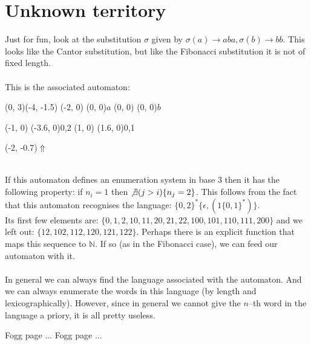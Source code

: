 \documentclass{article}
\begin{document}
\section*{Unknown territory}
Just for fun, look at the substitution $\sigma$ given by 
$\sigma(a) \rightarrow aba, \sigma(b) \rightarrow bb$. This looks like the 
Cantor substitution, but like the Fibonacci substitution it is not of fixed 
length.\\
\\
This is the associated automaton:\\
\begin{graph}(0, 3)(-4, -1.5)
  (-2, 0) (0, 0){$a$}
  (0, 0)  (0, 0){$b$}

  (-1, 0) \freetext(-3.6, 0){0,2}
   
  (1, 0) \freetext(1.6, 0){0,1}

  \freetext(-2, -0.7){$\Uparrow$}
\end{graph}\\
If this automaton defines an enumeration system in base 3 then it has the 
following property: if $n_i = 1$ then $\not\exists (j > i) \{ n_j = 2\}$. This 
follows from the fact that this automaton recognises the language:
$\{0, 2\}^* \{\epsilon, (1\{0, 1\}^*)\}$.\\
Its first few elements are:
$\{0, 1, 2, 10, 11, 20, 21, 22, 100, 101, 110, 111, 200\}$ and we left out:
$\{12, 102, 112, 120, 121, 122\}$. Perhaps there is an explicit function that
maps this sequence to $\mathbb{N}$. If so (as in the Fibonacci case), we can
feed our automaton with it.\\
\\
In general we can always find the language associated with the automaton. And
we can always enumerate the words in this language (by length and
lexicographically). However, since in general we cannot give the $n$--th word
in the language a priory, it is all pretty useless.

\begin{thebibliography}{XX}
 Fogg page ...
 Fogg page ...
\end{thebibliography}
\end{document}
